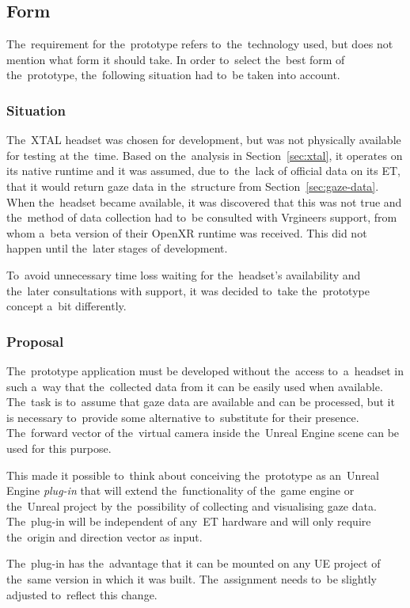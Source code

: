 \subsection{Form}
The~requirement for the~prototype refers to~the~technology used, but does not mention what form it should take. In order to~select the~best form of the~prototype, the~following situation had to~be taken into account.

\subsubsection*{Situation}
The~XTAL headset was chosen for development, but was not physically available for testing at the~time. Based on the~analysis in Section~\ref{sec:xtal}, it operates on its native runtime and it was assumed, due to~the~lack of official data on its ET, that it would return gaze data in the~structure from Section~\ref{sec:gaze-data}. When the~headset became available, it was discovered that this was not true and the~method of data collection had to~be consulted with Vrgineers support, from whom a~beta version of their OpenXR runtime was received. This did not happen until the~later stages of development.

To~avoid unnecessary time loss waiting for the~headset's availability and the~later consultations with support, it was decided to~take the~prototype concept a~bit differently.

\subsubsection*{Proposal}
The~prototype application must be developed without the~access to~a~headset in such a~way that the~collected data from it can be easily used when available. The~task is to~assume that gaze data are available and can be processed, but it is necessary to~provide some alternative to~substitute for their presence. The~forward vector of the~virtual camera inside the~Unreal Engine scene can be used for this purpose.

This made it possible to~think about conceiving the~prototype as an~Unreal Engine \emph{plug-in} that will extend the~functionality of the~game engine or the~Unreal project by the~possibility of collecting and visualising gaze data. The~plug-in will be independent of any~ET hardware and will only require the~origin and direction vector as input.

The~plug-in has the~advantage that it can be mounted on any UE project of the~same version in which it was built. The~assignment needs to~be slightly adjusted to~reflect this change.

